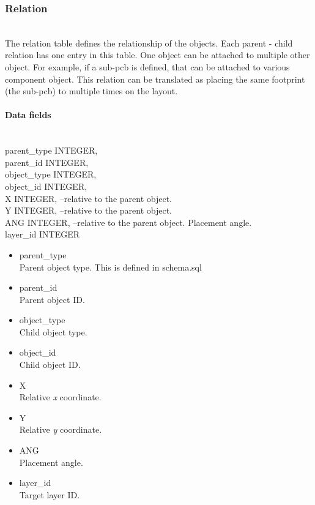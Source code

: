 \documentclass[12pt]{article}
\begin{document}
\subsubsection{Relation}\label{relation}

\mbox{}\\

The relation table defines the relationship of the objects. Each parent -
child relation has one entry in this table. One object can be attached to
multiple other object. For example, if a sub-pcb is defined, that can be
attached to various component object. This relation can be translated as
placing the same footprint (the sub-pcb) to multiple times on the layout.

\paragraph{Data fields}

\mbox{}\\

parent\_type INTEGER,\\
parent\_id INTEGER,\\
object\_type INTEGER,\\
object\_id INTEGER,\\
X INTEGER, --relative to the parent object.\\
Y INTEGER, --relative to the parent object.\\
ANG INTEGER, --relative to the parent object. Placement angle.\\
layer\_id INTEGER

\begin{itemize}
\item parent\_type\\
Parent object type. This is defined in schema.sql
\item parent\_id\\
Parent object ID.
\item object\_type\\
Child object type.
\item object\_id\\
Child object ID.
\item X\\
Relative \emph{x} coordinate.
\item Y\\
Relative \emph{y} coordinate.
\item ANG\\
Placement angle.
\item layer\_id\\
Target layer ID.
\end{itemize}
\end{document}
